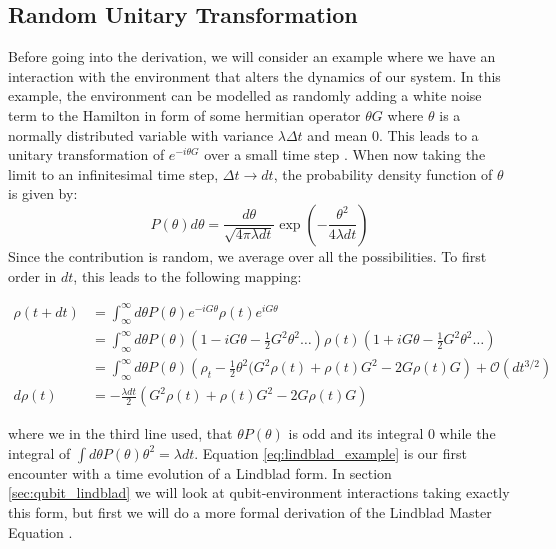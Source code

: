 \subsection{Random Unitary Transformation} \label{sec:random_unitary_transformation}
Before going into the derivation, we will consider an example where we have an interaction with the environment that alters the dynamics of our system. In this example, the environment can be modelled as randomly adding a white noise term to the Hamilton in form of some hermitian operator $\theta G$ where $\theta$ is a normally distributed variable with variance $\lambda \Delta t$ and mean $0$. This leads to a unitary transformation of $e^{-i\theta G}$ over a small time step . When now taking the limit to an infinitesimal time step, $\Delta t \to dt$, the probability density function of $\theta$ is given by:
\begin{equation}
    P(\theta) d\theta = \frac{d\theta}{\sqrt{4\pi\lambda dt}}\exp(-\frac{\theta^2}{4\lambda dt})
\end{equation}
Since the contribution is random, we average over all the possibilities. To first order in $dt$, this leads to the following mapping:
\begin{fullwidth}
\begin{align}
    \rho(t+dt)  &= \int_\infty^\infty d\theta P(\theta) e^{-iG\theta}\rho(t)e^{iG\theta}  \nonumber \\
                &= \int_\infty^\infty d\theta P(\theta) (1 - iG\theta  - \frac12 G^2\theta^2 \dots)\rho(t) (1 + iG\theta - \frac12 G^2\theta^2 \dots)  \nonumber \\
                &= \int_\infty^\infty d\theta P(\theta) \left(\rho_t - \frac12\theta^2(G^2\rho(t) + \rho(t)G^2 - 2 G\rho(t) G\right) + \mathcal{O}(dt^{3/2}) \nonumber \\
    d\rho(t)    &=  - \frac{\lambda dt}{2} \left(G^2\rho(t) + \rho(t)G^2 - 2 G\rho(t) G\right) \label{eq:lindblad_example}
\end{align}
\end{fullwidth}
where we in the third line used, that $\theta P(\theta)$ is odd and its integral $0$ while the integral of $\int d\theta P(\theta) \theta^2 = \lambda dt$. Equation \ref{eq:lindblad_example} is our first encounter with a time evolution of a Lindblad form. In section \ref{sec:qubit_lindblad} we will look at qubit-environment interactions taking exactly this form, but first we will do a more formal derivation of the Lindblad Master Equation \cite{pearle_simple_2012}.


